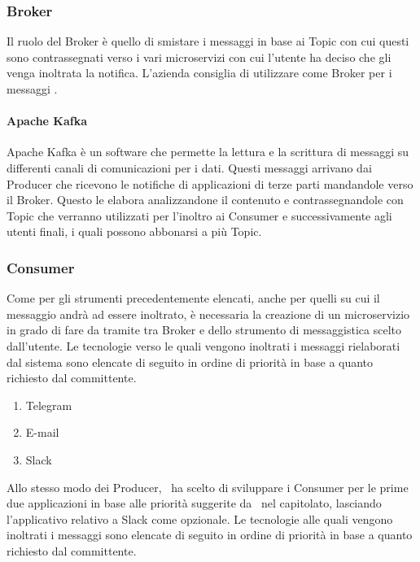 		
	\subsubsection{Broker}
	
		Il ruolo del Broker è quello di smistare i messaggi in base ai Topic con cui questi sono contrassegnati verso i vari microservizi con cui l'utente ha deciso che gli venga inoltrata la notifica.
		L'azienda consiglia di utilizzare come Broker per i messaggi .
	
		\paragraph{Apache Kafka}
		Apache Kafka è un software  che permette la lettura e la scrittura di messaggi su differenti canali di comunicazioni per i dati.
		Questi messaggi arrivano dai Producer che ricevono le notifiche di applicazioni di terze parti mandandole verso il Broker. Questo le elabora analizzandone il contenuto e contrassegnandole con Topic che verranno utilizzati per l'inoltro ai Consumer e successivamente agli utenti finali, i quali possono abbonarsi a più Topic.
	
	\subsubsection{Consumer}
		Come per gli strumenti precedentemente elencati, anche per quelli su cui il messaggio andrà ad essere inoltrato, è necessaria la creazione di un microservizio in grado di fare da tramite tra Broker e  dello strumento di messaggistica scelto dall'utente.
		Le tecnologie verso le quali vengono inoltrati i messaggi rielaborati dal sistema sono elencate di seguito in ordine di priorità in base a quanto richiesto dal committente.
		\begin{enumerate}
			\item Telegram
			\item E-mail
			\item Slack
		\end{enumerate}
		Allo stesso modo dei Producer, \gruppo\ ha scelto di sviluppare i Consumer per le prime due applicazioni in base alle priorità suggerite da \II\ nel capitolato, lasciando l'applicativo relativo a Slack come opzionale.
		Le tecnologie alle quali vengono inoltrati i messaggi sono elencate di seguito in ordine di priorità in base a quanto richiesto dal committente.
			
